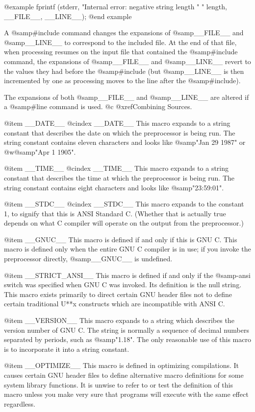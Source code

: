 {{{{@example
fprintf (stderr, "Internal error: negative string length "
                 "%
         length, __FILE__, __LINE__);
@end example

A @samp{#include} command changes the expansions of @samp{__FILE__}
and @samp{__LINE__} to correspond to the included file.  At the end of
that file, when processing resumes on the input file that contained
the @samp{#include} command, the expansions of @samp{__FILE__} and
@samp{__LINE__} revert to the values they had before the
@samp{#include} (but @samp{__LINE__} is then incremented by one as
processing moves to the line after the @samp{#include}).

The expansions of both @samp{__FILE__} and @samp{__LINE__} are altered
if a @samp{#line} command is used.
@c @xref{Combining Sources}.

@item __DATE__
@cindex __DATE__
This macro expands to a string constant that describes the date on
which the preprocessor is being run.  The string constant contains
eleven characters and looks like @samp{"Jan 29 1987"} or
@w{@samp{"Apr 1 1905"}}.

@item __TIME__
@cindex __TIME__
This macro expands to a string constant that describes the time at
which the preprocessor is being run.  The string constant contains
eight characters and looks like @samp{"23:59:01"}.

@item __STDC__
@cindex __STDC__
This macro expands to the constant 1, to signify that this is ANSI
Standard C. (Whether that is actually true depends on what C compiler
will operate on the output from the preprocessor.)

@item __GNUC__
This macro is defined if and only if this is GNU C.  This macro is
defined only when the entire GNU C compiler is in use; if you invoke
the preprocessor directly, @samp{__GNUC__} is undefined.

@item __STRICT_ANSI__
This macro is defined if and only if the @samp{-ansi} switch was
specified when GNU C was invoked.  Its definition is the null string.
This macro exists primarily to direct certain GNU header files not to
define certain traditional U**x constructs which are incompatible with
ANSI C.

@item __VERSION__
This macro expands to a string which describes the version number of
GNU C.  The string is normally a sequence of decimal numbers separated
by periods, such as @samp{"1.18"}.  The only reasonable use of this
macro is to incorporate it into a string constant.

@item __OPTIMIZE__
This macro is defined in optimizing compilations.  It causes certain
GNU header files to define alternative macro definitions for some
system library functions.  It is unwise to refer to or test the
definition of this macro unless you make very sure that programs will
execute with the same effect regardless.

}}}}
